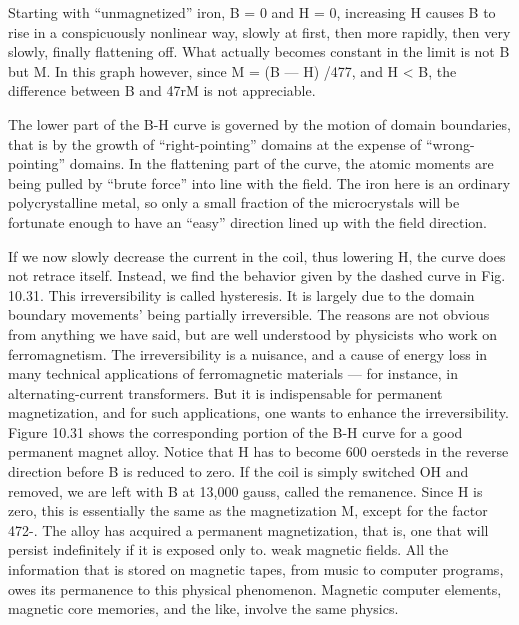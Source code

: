 Starting with ``unmagnetized'' iron, B = 0 and H = 0, increasing
H causes B to rise in a conspicuously nonlinear way, slowly at
first, then more rapidly, then very slowly, finally flattening off. What
actually becomes constant in the limit is not B but M. In this graph
however, since M = (B  ---  H) /477, and H < B, the difference between
B and 47rM is not appreciable.

The lower part of the B-H curve is governed by the motion of
domain boundaries, that is by the growth of ``right-pointing'' domains
at the expense of ``wrong-pointing'' domains. In the flattening
part of the curve, the atomic moments are being pulled by ``brute
force'' into line with the field. The iron here is an ordinary 
polycrystalline metal, so only a small fraction of the microcrystals will
be fortunate enough to have an ``easy'' direction lined up with the
field direction.

If we now slowly decrease the current in the coil, thus lowering H,
the curve does not retrace itself. Instead, we find the behavior given
by the dashed curve in Fig. 10.31. This irreversibility is called
hysteresis. It is largely due to the domain boundary movements'
being partially irreversible. The reasons are not obvious from anything
we have said, but are well understood by physicists who work
on ferromagnetism. The irreversibility is a nuisance, and a cause
of energy loss in many technical applications of ferromagnetic
materials --- for instance, in alternating-current transformers. But it
is indispensable for permanent magnetization, and for such 
applications, one wants to enhance the irreversibility. Figure 10.31 shows
the corresponding portion of the B-H curve for a good permanent
magnet alloy. Notice that H has to become 600 oersteds in the
reverse direction before B is reduced to zero. If the coil is simply
switched OH and removed, we are left with B at 13,000 gauss, called
the remanence. Since H is zero, this is essentially the same as the
magnetization M, except for the factor 472-. The alloy has acquired
a permanent magnetization, that is, one that will persist indefinitely
if it is exposed only to. weak magnetic fields. All the information
that is stored on magnetic tapes, from music to computer programs,
owes its permanence to this physical phenomenon. Magnetic 
computer elements, magnetic core memories, and the like, involve the
same physics.

\fi
